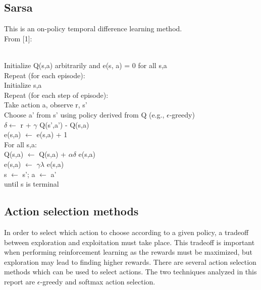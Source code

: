 \documentclass{article}
\newcommand{\tab}{\hspace{10mm}}
\newcommand{\dtab}{\hspace{20mm}}
\newcommand{\ttab}{\hspace{30mm}}
\begin{document}
\subsection*{Sarsa}
This is an on-policy temporal difference learning method. %
\\
From [1]: \\\\
\begin{algorithm}[H]
Initialize Q(s,a) arbitrarily and e(s, a) = 0 for all s,a \\
Repeat (for each episode):\\
\tab Initialize s,a\\
\tab Repeat (for each step of episode):\\
\dtab Take action a, observe r, s'\\
\dtab Choose a' from s' using policy derived from Q (e.g., $\epsilon$-greedy)\\
\dtab $\delta \leftarrow$ r + $\gamma$ Q(s',a') - Q(s,a)\\
\dtab e(s,a) $\leftarrow$ e(s,a) + 1\\
\dtab For all s,a:\\
\ttab Q(s,a) $\leftarrow$ Q(s,a) + $\alpha \delta$ e(s,a) \\
\ttab e(s,a) $\leftarrow$ $\gamma \lambda$ e(s,a)\\
\dtab s $\leftarrow$ s'; a $\leftarrow$ a'\\
\tab until s is terminal\\
\end{algorithm}

\subsection*{Action selection methods}
In order to select which action to choose according to a given policy, a tradeoff between exploration and exploitation must take place. This tradeoff is important when performing reinforcement learning as the rewards must be maximized, but exploration may lead to finding higher rewards. There are several action selection methods which can be used to select actions. The two techniques analyzed in this report are $\epsilon$-greedy and softmax action selection.
\end{document}
